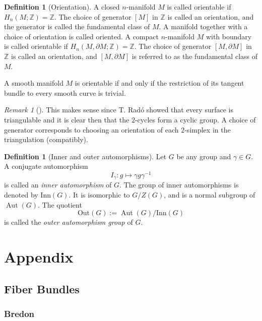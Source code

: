 \documentclass[reqno]{amsart}
\theoremstyle{definition}
\newtheorem{definition}[theorem]{Definition}
\theoremstyle{remark}
\newtheorem*{remark}{Remark}
\DeclareMathOperator{\Aut}{Aut}
\begin{document}
\begin{definition}[Orientation]
    A closed $n$-manifold $M$ is called orientable
    if $H_n \left( M ; \mathbb{Z} \right) = \mathbb{Z}$.
    The choice of generator $\left[ M \right] $ in
    $\mathbb{Z}$ is called an orientation, and the generator
    is called the fundamental class of $M$. A manifold
    together with a choice of orientation is
    called oriented. A compact $n$-manifold $M$ with
    boundary is called orientable if
    $H_n \left( M, \partial M ; \mathbb{Z} \right) = \mathbb{Z}$.
    The choice of generator $\left[ M, \partial M \right] $ in
    $\mathbb{Z}$ is called an orientation, and
    $\left[ M, \partial M \right] $ is referred to as
    the fundamental class of $M$.

    A smooth manifold $M$ is orientable if and only if
    the restriction of its tangent bundle to every smooth
    curve is trivial.

    \begin{remark}[]
        This makes sense since T. Radó showed that every surface
        is triangulable and it is clear then that the $2$-cycles
        form a cyclic group. A choice of generator corresponds
        to choosing an orientation of each $2$-simplex in the
        triangulation (compatibly).
    \end{remark}
\end{definition}

\begin{definition}[Inner and outer automorphisms]
    Let $G$ be any group and $\gamma \in G$. A conjugate
    automorphism 
    \[
    I_{\gamma} \colon g \mapsto \gamma g \gamma^{-1}
    \] 
    is called an \textit{inner automorphism} of $G$.
    The group of inner automorphisms is denoted
    by $\text{Inn}(G)$. It is isomorphic to
    $G / Z(G)$, and is a normal subgroup of
    $\Aut(G)$. The quotient
    \[
    \text{Out}(G) := \Aut(G) / \text{Inn}(G)
    \] 
    is called the \textit{outer automorphism group} of
    $G$.
\end{definition}

\section{Appendix}

\subsection{Fiber Bundles}

\subsubsection{Bredon}
\end{document}
